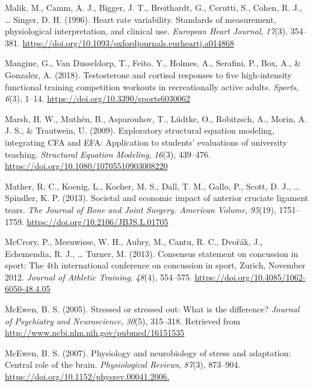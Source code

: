 \documentclass[man,floatsintext]{apa6}
\begin{document}
\leavevmode\hypertarget{ref-Malik1996}{}%
Malik, M., Camm, A. J., Bigger, J. T., Breithardt, G., Cerutti, S., Cohen, R. J., \ldots{} Singer, D. H. (1996). Heart rate variability. Standards of measurement, physiological interpretation, and clinical use. \emph{European Heart Journal}, \emph{17}(3), 354--381. \url{https://doi.org/10.1093/oxfordjournals.eurheartj.a014868}

\leavevmode\hypertarget{ref-Mangine2018}{}%
Mangine, G., Van Dusseldorp, T., Feito, Y., Holmes, A., Serafini, P., Box, A., \& Gonzalez, A. (2018). Testosterone and cortisol responses to five high-intensity functional training competition workouts in recreationally active adults. \emph{Sports}, \emph{6}(3), 1--14. \url{https://doi.org/10.3390/sports6030062}

\leavevmode\hypertarget{ref-Marsh2009}{}%
Marsh, H. W., Muthén, B., Asparouhov, T., Lüdtke, O., Robitzsch, A., Morin, A. J. S., \& Trautwein, U. (2009). Exploratory structural equation modeling, integrating CFA and EFA: Application to students' evaluations of university teaching. \emph{Structural Equation Modeling}, \emph{16}(3), 439--476. \url{https://doi.org/10.1080/10705510903008220}

\leavevmode\hypertarget{ref-Mather2013}{}%
Mather, R. C., Koenig, L., Kocher, M. S., Dall, T. M., Gallo, P., Scott, D. J., \ldots{} Spindler, K. P. (2013). Societal and economic impact of anterior cruciate ligament tears. \emph{The Journal of Bone and Joint Surgery. American Volume}, \emph{95}(19), 1751--1759. \url{https://doi.org/10.2106/JBJS.L.01705}

\leavevmode\hypertarget{ref-McCrory2013}{}%
McCrory, P., Meeuwisse, W. H., Aubry, M., Cantu, R. C., Dvořák, J., Echemendia, R. J., \ldots{} Turner, M. (2013). Consensus statement on concussion in sport: The 4th international conference on concussion in sport, Zurich, November 2012. \emph{Journal of Athletic Training}, \emph{48}(4), 554--575. \url{https://doi.org/10.4085/1062-6050-48.4.05}

\leavevmode\hypertarget{ref-McEwen2005}{}%
McEwen, B. S. (2005). Stressed or stressed out: What is the difference? \emph{Journal of Psychiatry and Neuroscience}, \emph{30}(5), 315--318. Retrieved from \url{http://www.ncbi.nlm.nih.gov/pubmed/16151535}

\leavevmode\hypertarget{ref-McEwen2007}{}%
McEwen, B. S. (2007). Physiology and neurobiology of stress and adaptation: Central role of the brain. \emph{Physiological Reviews}, \emph{87}(3), 873--904. \url{https://doi.org/10.1152/physrev.00041.2006.}
\end{document}
